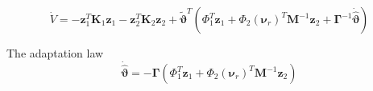\documentclass[12pt,a4]{article}
\begin{document}
\begin{equation}
	\dot{V} =  - \bm{z}_1^T \bm{K}_1 \bm{z}_1 -  \bm{z}_2^T \bm{K}_2 \bm{z}_2 + \bm{\tilde{\vartheta}}^T \left(  \Phi_1^T\bm{z}_1 +  \Phi_2 (\bm{\nu}_r )^T\bm{M}^{-1}\bm{z}_2 + \bm{\Gamma}^{-1}\bm{\dot{\hat{\vartheta}}} \right)
\end{equation}

The adaptation law
\begin{equation}
	\bm{\dot{\hat{\vartheta}}} = - \bm{\Gamma} \left( \Phi_1^T\bm{z}_1 +  \Phi_2 (\bm{\nu}_r )^T\bm{M}^{-1}\bm{z}_2 \right)
\end{equation}
\end{document}
